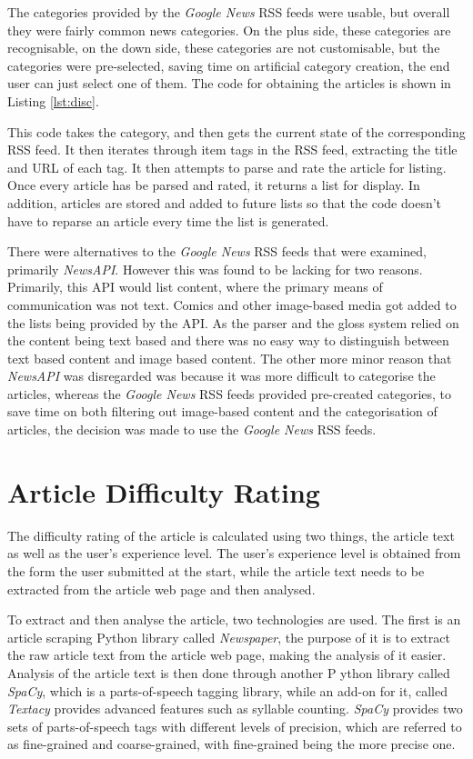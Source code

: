 The categories provided by the \textit{Google News} RSS feeds were usable, but overall they were fairly common news categories. On the plus side, these categories are recognisable, on the down side, these categories are not customisable, but the categories were pre-selected, saving time on artificial category creation, the end user can just select one of them. The code for obtaining the articles is shown in Listing \ref{lst:disc}.



This code takes the category, and then gets the current state of the corresponding RSS feed. It then iterates through item tags in the RSS feed, extracting the title and URL of each tag. It then attempts to parse and rate the article for listing. Once every article has be parsed and rated, it returns a list for display. In addition, articles are stored and added to future lists so that the code doesn't have to reparse an article every time the list is generated.

There were alternatives to the \textit{Google News} RSS feeds that were examined, primarily \textit{NewsAPI}. However this was found to be lacking for two reasons. Primarily, this API would list content, where the primary means of communication was not text. Comics and other image-based media got added to the lists being provided by the API. As the parser and the gloss system relied on the content being text based and there was no easy way to distinguish between text based content and image based content. The other more minor reason that \textit{NewsAPI} was disregarded was because it was more difficult to categorise the articles, whereas the \textit{Google News} RSS feeds provided pre-created categories, to save time on both filtering out image-based content and the categorisation of articles, the decision was made to use the \textit{Google News} RSS feeds. 


\section{Article Difficulty Rating}

The difficulty rating of the article is calculated using two things, the article text as well as the user's experience level. The user's experience level is obtained from the form the user submitted at the start, while the article text needs to be extracted from the article web page and then analysed.

To extract and then analyse the article, two technologies are used. The first is an article scraping Python library called \textit{Newspaper}, the purpose of it is to extract the raw article text from the article web page, making the analysis of it easier. Analysis of the article text is then done through another P ython library called \textit{SpaCy}, which is a parts-of-speech tagging library, while an add-on for it, called \textit{Textacy} provides advanced features such as syllable counting. \textit{SpaCy} provides two  sets of parts-of-speech tags with different levels of precision, which are referred to as fine-grained and coarse-grained, with fine-grained being the more precise one.

